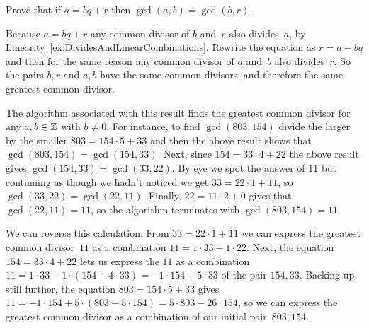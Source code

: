 \documentclass{ibl}  %
\begin{document}
\begin{euclidproof}
\begin{problem}
\end{problem}
\end{euclidproof}


\begin{bezoutproof}
\begin{problem}
Prove that if $a=bq+r$ then $\gcd(a,b)=\gcd(b,r)$.  
\begin{answer}
Because $a=bq+r$ any common divisor of $b$ and~$r$ also divides~$a$, 
by Linearity~\ref{ex:DividesAndLinearCombinations}.
Rewrite the equation as $r=a-bq$ and then for the same reason any
common divisor of $a$ and~$b$ also divides~$r$.
So the pairs $b,r$ and $a,b$ have the same common divisors, and
therefore the same greatest common divisor.
\end{answer}
\end{problem}

The algorithm associated with this result finds the greatest common
divisor for any $a,b\in\mathbb{Z}$ with $b\neq 0$.  
For instance, to find $\gcd(803,154)$ divide the larger by
the smaller $803=154\cdot 5+33$ and then the above result shows that  
$\gcd(803,154)=\gcd(154,33)$.
Next, since $154=33\cdot 4+22$ the above result gives
$\gcd(154,33)=\gcd(33,22)$.
By eye we spot the answer of $11$ but continuing as though we hadn't noticed
we get $33=22\cdot 1+11$, so $\gcd(33,22)=\gcd(22,11)$.
Finally, $22=11\cdot 2+0$ gives that 
$\gcd(22,11)=11$, so the algorithm terminates with $\gcd(803,154)=11$.

We can reverse this calculation.
From $33=22\cdot 1+11$ we can  
express the greatest common divisor~$11$ as a combination 
$11=1\cdot 33-1\cdot 22$.
Next, 
the equation $154=33\cdot 4+22$ lets us express
the $11$ as a combination 
$11=1\cdot 33-1\cdot (154-4\cdot 33)=-1\cdot 154+5\cdot 33$
of the pair $154,33$.
Backing up still further, the equation 
$803=154\cdot 5+33$
gives $11=-1\cdot 154+5\cdot (803-5\cdot 154)=5\cdot 803-26\cdot 154$, so 
we can express the greatest common divisor as a combination of our
initial pair~$803,154$.



\end{bezoutproof}
\end{document}
